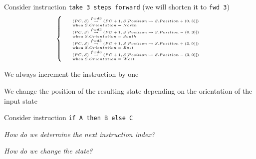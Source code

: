 \documentclass{beamer}
\begin{document}
\begin{slide}{
\item Consider instruction \texttt{take 3 steps forward} (we will shorten it to \texttt{fwd 3})
\begin{align*}
\tiny
\left\lbrace
\begin{array}{l l}
&(PC,S) \overset{fwd 3}{\rightarrow} (PC+1,S[Position \mapsto S.Position+(0,3)])\\
&\mathrm{when} \; S.Orientation=North \\
&(PC,S) \overset{fwd 3}{\rightarrow} (PC+1,S[Position \mapsto S.Position-(0,3)]) \\
&\mathrm{when} \; S.Orientation=South \\
&(PC,S) \overset{fwd 3}{\rightarrow} (PC+1,S[Position \mapsto S.Position+(3,0)]) \\
&\mathrm{when} \; S.Orientation=East \\
&(PC,S) \overset{fwd 3}{\rightarrow} (PC+1,S[Position \mapsto S.Position-(3,0)]) \\
&\mathrm{when} \; S.Orientation=West \\
\end{array}
\right.
\end{align*}
\item We always increment the instruction by one
\item We change the position of the resulting state depending on the orientation of the input state
}\end{slide}

\begin{slide}{
\item Consider instruction \texttt{if A then B else C}
\item \textit{How do we determine the next instruction index?}
\item \textit{How do we change the state?}
}\end{slide}

\end{document}
